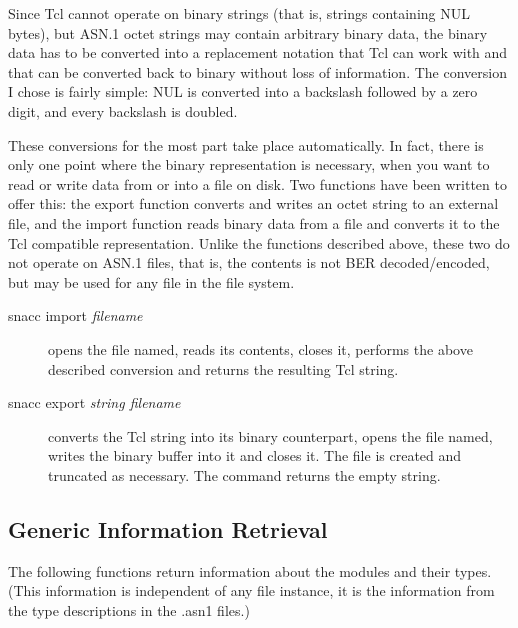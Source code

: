 Since Tcl cannot operate on binary strings (that is, strings containing NUL bytes), but ASN.1 octet strings may contain arbitrary binary data, the binary data has to be converted into a replacement notation that Tcl can work with and that can be converted back to binary without loss of information.
The conversion I chose is fairly simple: NUL is converted into a backslash followed by a zero digit, and every backslash is doubled.

These conversions for the most part take place automatically.
In fact, there is only one point where the binary representation is necessary, when you want to read or write data from or into a file on disk.
Two functions have been written to offer this: the export function converts and writes an octet string to an external file, and the import function reads binary data from a file and converts it to the Tcl compatible representation.
Unlike the functions described above, these two do not operate on ASN.1 files, that is, the contents is not BER decoded/encoded, but may be used for any file in the file system.

\begin{description}%
  \item[{\Tcl snacc import \emph{filename}}] opens the file named, reads its contents, closes it, performs the above described conversion and returns the resulting Tcl string.
  \item[{\Tcl snacc export \emph{string filename}}] converts the Tcl string into its binary counterpart, opens the file named, writes the binary buffer into it and closes it.
    The file is created and truncated as necessary.
    The command returns the empty string.
\end{description}%

\subsection{Generic Information Retrieval}

The following functions return information about the modules and their types.
(This information is independent of any file instance, it is the information from the type descriptions in the {\ufn .asn1} files.)


